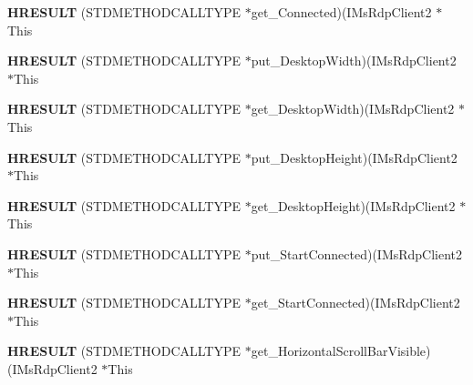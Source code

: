 \begin{DoxyCompactItemize}
{\bfseries H\+R\+E\+S\+U\+LT} (S\+T\+D\+M\+E\+T\+H\+O\+D\+C\+A\+L\+L\+T\+Y\+PE $\ast$get\+\_\+\+Connected)(I\+Ms\+Rdp\+Client2 $\ast$This
\item 
\mbox{\label{struct_i_ms_rdp_client2_vtbl_a74036bd927c0111f44207bbb82f951b7}} 
{\bfseries H\+R\+E\+S\+U\+LT} (S\+T\+D\+M\+E\+T\+H\+O\+D\+C\+A\+L\+L\+T\+Y\+PE $\ast$put\+\_\+\+Desktop\+Width)(I\+Ms\+Rdp\+Client2 $\ast$This
\item 
\mbox{\label{struct_i_ms_rdp_client2_vtbl_a7bd107dcba4727f1d4c377f8fd0af663}} 
{\bfseries H\+R\+E\+S\+U\+LT} (S\+T\+D\+M\+E\+T\+H\+O\+D\+C\+A\+L\+L\+T\+Y\+PE $\ast$get\+\_\+\+Desktop\+Width)(I\+Ms\+Rdp\+Client2 $\ast$This
\item 
\mbox{\label{struct_i_ms_rdp_client2_vtbl_a6503b39056ea625d9dbe5ce9aaa767c1}} 
{\bfseries H\+R\+E\+S\+U\+LT} (S\+T\+D\+M\+E\+T\+H\+O\+D\+C\+A\+L\+L\+T\+Y\+PE $\ast$put\+\_\+\+Desktop\+Height)(I\+Ms\+Rdp\+Client2 $\ast$This
\item 
\mbox{\label{struct_i_ms_rdp_client2_vtbl_aba90e6f71c03607b8672f57f9f68f08e}} 
{\bfseries H\+R\+E\+S\+U\+LT} (S\+T\+D\+M\+E\+T\+H\+O\+D\+C\+A\+L\+L\+T\+Y\+PE $\ast$get\+\_\+\+Desktop\+Height)(I\+Ms\+Rdp\+Client2 $\ast$This
\item 
\mbox{\label{struct_i_ms_rdp_client2_vtbl_a1d9e1a82b26cd718053835aa1af6c123}} 
{\bfseries H\+R\+E\+S\+U\+LT} (S\+T\+D\+M\+E\+T\+H\+O\+D\+C\+A\+L\+L\+T\+Y\+PE $\ast$put\+\_\+\+Start\+Connected)(I\+Ms\+Rdp\+Client2 $\ast$This
\item 
\mbox{\label{struct_i_ms_rdp_client2_vtbl_a716b0d9e1cebcc511bdd25469fe70998}} 
{\bfseries H\+R\+E\+S\+U\+LT} (S\+T\+D\+M\+E\+T\+H\+O\+D\+C\+A\+L\+L\+T\+Y\+PE $\ast$get\+\_\+\+Start\+Connected)(I\+Ms\+Rdp\+Client2 $\ast$This
\item 
\mbox{\label{struct_i_ms_rdp_client2_vtbl_ac34b7caff15da89529b34f9c7a3e2465}} 
{\bfseries H\+R\+E\+S\+U\+LT} (S\+T\+D\+M\+E\+T\+H\+O\+D\+C\+A\+L\+L\+T\+Y\+PE $\ast$get\+\_\+\+Horizontal\+Scroll\+Bar\+Visible)(I\+Ms\+Rdp\+Client2 $\ast$This
\item 

\end{DoxyCompactItemize}
